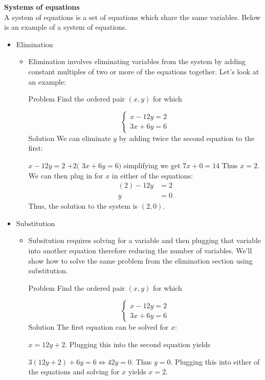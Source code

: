 \documentclass[11pt,letterpaper]{article}
\begin{document}
\begin{minipage}{\textwidth}
     \vspace{0.4cm}
     \noindent \textbf{Systems of equations}\\
     A system of equations is a set of equations which share the same variables. Below is an example of a system of equations.
     \begin{itemize}
          \item Elimination
          \begin{itemize}
               \item  Elimination involves eliminating variables from the system by adding constant multiples of two or more of the equations together. Let's look at an example:

               Problem
               Find the ordered pair $(x,y)$ for which
               
               \[\left\{\begin{array}{l}x-12y=2\\3x+6y=6\end{array}\right.\]
               Solution
               We can eliminate $y$ by adding twice the second equation to the first:
               
               $x - 12y= 2$
               $+2($	$3x + 6y = 6)$
               simplifying we get ${7x + 0=14}$
               Thus $x=2$. We can then plug in for $x$ in either of the equations:\begin{align*} (2)-12y &= 2 \\ y &= 0 \end{align*}
               Thus, the solution to the system is $(2,0)$.
          \end{itemize}
          \item Substitution
          \begin{itemize}
               \item Subsitution requires solving for a variable and then plugging that variable into another equation therefore reducing the number of variables. We'll show how to solve the same problem from the elimination section using substitution.

               Problem
               Find the ordered pair $(x,y)$ for which
               
               \[\left\{\begin{array}{l}x-12y=2\\3x+6y=6\end{array}\right.\]
               Solution
               The first equation can be solved for $x$:
               
               $x = 12y + 2.$
               Plugging this into the second equation yields
               
               $3(12y + 2) + 6y = 6 \Leftrightarrow 42 y = 0.$
               Thus $y=0$. Plugging this into either of the equations and solving for $x$ yields $x=2$.
          \end{itemize}
     \end{itemize}
\end{minipage}
\end{document}
